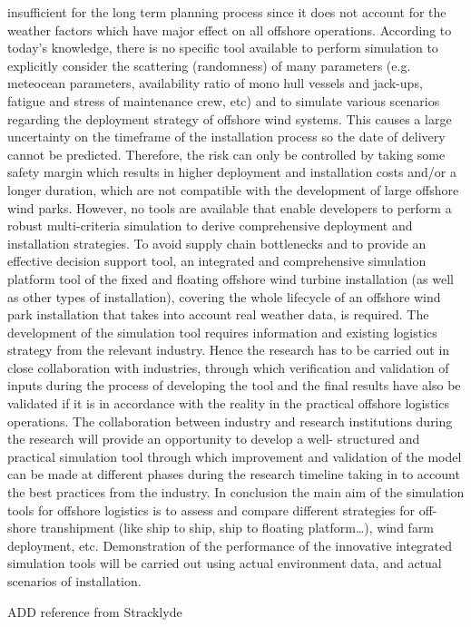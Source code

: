 insufficient for the long term planning process since it does not account for the weather factors which have major effect on all offshore
operations. According to today’s knowledge, there is no specific tool available to perform simulation to explicitly consider the scattering
(randomness) of many parameters (e.g. meteocean parameters, availability ratio of mono hull vessels and jack-ups, fatigue and stress of
maintenance crew, etc) and to simulate various scenarios regarding the deployment strategy of offshore wind systems. This causes a large
uncertainty on the timeframe of the installation process so the date of delivery cannot be predicted. Therefore, the risk can only be controlled by
taking some safety margin which results in higher deployment and installation costs and/or a longer duration, which are not compatible with the
development of large offshore wind parks. However, no tools are available that enable developers to perform a robust multi-criteria simulation to
derive comprehensive deployment and installation strategies.
To avoid supply chain bottlenecks and to provide an effective decision support tool, an integrated and comprehensive simulation platform tool
of the fixed and floating offshore wind turbine installation (as well as other types of installation), covering the whole lifecycle of an offshore wind
park installation that takes into account real weather data, is required.
The development of the simulation tool requires information and existing logistics strategy from the relevant industry. Hence the research has to
be carried out in close collaboration with industries, through which verification and validation of inputs during the process of developing the tool
and the final results have also be validated if it is in accordance with the reality in the practical offshore logistics operations. The collaboration
between industry and research institutions during the research will provide an opportunity to develop a well- structured and practical simulation
tool through which improvement and validation of the model can be made at different phases during the research timeline taking in to account
the best practices from the industry.
In conclusion the main aim of the simulation tools for offshore logistics is to assess and compare different strategies for off-shore transhipment
(like ship to ship, ship to floating platform…), wind farm deployment, etc. Demonstration of the performance of the innovative integrated
simulation tools will be carried out using actual environment data, and actual scenarios of installation.

ADD reference from Stracklyde